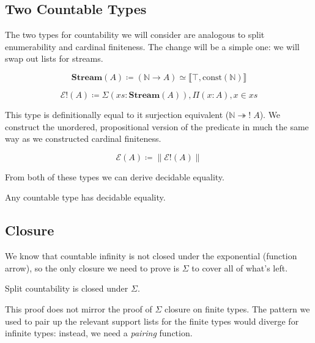\subsection{Two Countable Types}
The two types for countability we will consider are analogous to split
enumerability and cardinal finiteness.
The change will be a simple one: we will swap out lists for streams.
\begin{definition}[Streams]
  \begin{equation}
    \mathbf{Stream}(A) \coloneqq (\mathbb{N} \rightarrow A)
    \simeq \llbracket \top , \text{const}(\mathbb{N}) \rrbracket
  \end{equation}
\end{definition}
\begin{definition}
  \begin{equation}
    \mathcal{E}!(A) \coloneqq \Sigma {(\mathit{xs} : \mathbf{Stream}(A))} , \Pi {(x : A)} , x \in \mathit{xs}
  \end{equation}
\end{definition}
This type is definitionally equal to it surjection equivalent (\(\mathbb{N}
\twoheadrightarrow ! \; A\)).
We construct the unordered, propositional version of the predicate in much the
same way as we constructed cardinal finiteness.
\begin{definition}[Countability]
  \begin{equation}
    \mathcal{E}(A) \coloneqq \lVert \mathcal{E}!(A) \rVert
  \end{equation}
\end{definition}

From both of these types we can derive decidable equality.
\begin{lemma}
  Any countable type has decidable equality.
\end{lemma}
\subsection{Closure}
We know that countable infinity is not closed under the exponential (function
arrow), so the only closure we need to prove is \(\Sigma\) to cover all of
what's left.
\begin{theorem} \label{split-countability-sigma}
  Split countability is closed under \(\Sigma\).
\end{theorem}
This proof does not mirror the proof of \(\Sigma\) closure on finite types.
The pattern we used to pair up the relevant support lists for the finite types
would diverge for infinite types: instead, we need a \emph{pairing} function.

